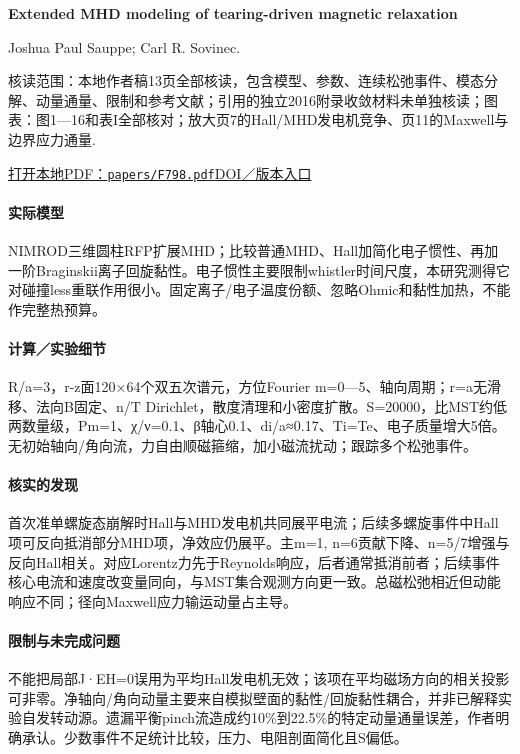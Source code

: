 \textbf{Extended MHD modeling of tearing-driven magnetic relaxation}\citep{F798}\

Joshua Paul Sauppe;  Carl R. Sovinec.

\textsf{核读范围：}本地作者稿13页全部核读，包含模型、参数、连续松弛事件、模态分解、动量通量、限制和参考文献；引用的独立2016附录收敛材料未单独核读；\textsf{图表：}图1—16和表I全部核对；放大页7的Hall/MHD发电机竞争、页11的Maxwell与边界应力通量.

\href{run:papers/F798.pdf}{打开本地PDF：\texttt{papers/F798.pdf}}\quad\href{https://doi.org/10.1063/1.4977540}{DOI／版本入口}

\paragraph{实际模型}NIMROD三维圆柱RFP扩展MHD；比较普通MHD、Hall加简化电子惯性、再加一阶Braginskii离子回旋黏性。电子惯性主要限制whistler时间尺度，本研究测得它对碰撞less重联作用很小。固定离子/电子温度份额、忽略Ohmic和黏性加热，不能作完整热预算。

\paragraph{计算／实验细节}R/a=3，r-z面120×64个双五次谱元，方位Fourier m=0—5、轴向周期；r=a无滑移、法向B固定、n/T Dirichlet，散度清理和小密度扩散。S=20000，比MST约低两数量级，Pm=1、χ/ν=0.1、β轴心0.1、di/a≈0.17、Ti=Te、电子质量增大5倍。无初始轴向/角向流，力自由顺磁箍缩，加小磁流扰动；跟踪多个松弛事件。

\paragraph{核实的发现}首次准单螺旋态崩解时Hall与MHD发电机共同展平电流；后续多螺旋事件中Hall项可反向抵消部分MHD项，净效应仍展平。主m=1, n=6贡献下降、n=5/7增强与反向Hall相关。对应Lorentz力先于Reynolds响应，后者通常抵消前者；后续事件核心电流和速度改变量同向，与MST集合观测方向更一致。总磁松弛相近但动能响应不同；径向Maxwell应力输运动量占主导。

\paragraph{限制与未完成问题}不能把局部J·EH=0误用为平均Hall发电机无效；该项在平均磁场方向的相关投影可非零。净轴向/角向动量主要来自模拟壁面的黏性/回旋黏性耦合，并非已解释实验自发转动源。遗漏平衡pinch流造成约10\%到22.5\%的特定动量通量误差，作者明确承认。少数事件不足统计比较，压力、电阻剖面简化且S偏低。

